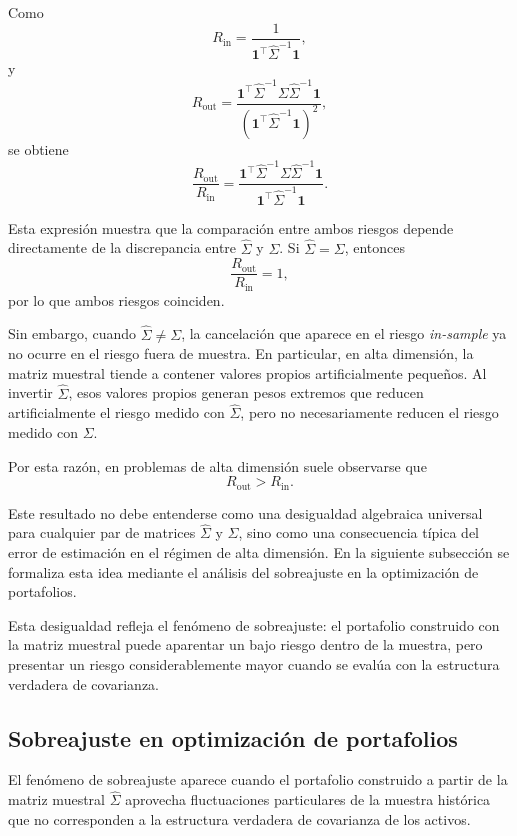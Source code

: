 \documentclass[letterpaper,12pt,oneside]{book}
\begin{document}
Como
\[
R_{\mathrm{in}}
=
\frac{
1
}{
\mathbf{1}^\top
\widehat{\Sigma}^{-1}
\mathbf{1}
},
\]
y
\[
R_{\mathrm{out}}
=
\frac{
\mathbf{1}^\top
\widehat{\Sigma}^{-1}
\Sigma
\widehat{\Sigma}^{-1}
\mathbf{1}
}{
\left(
\mathbf{1}^\top
\widehat{\Sigma}^{-1}
\mathbf{1}
\right)^2
},
\]
se obtiene
\[
\frac{R_{\mathrm{out}}}{R_{\mathrm{in}}}
=
\frac{
\mathbf{1}^\top
\widehat{\Sigma}^{-1}
\Sigma
\widehat{\Sigma}^{-1}
\mathbf{1}
}{
\mathbf{1}^\top
\widehat{\Sigma}^{-1}
\mathbf{1}
}.
\]

Esta expresión muestra que la comparación entre ambos riesgos depende directamente de la discrepancia entre \(\widehat{\Sigma}\) y \(\Sigma\). Si \(\widehat{\Sigma}=\Sigma\), entonces
\[
\frac{R_{\mathrm{out}}}{R_{\mathrm{in}}}
=
1,
\]
por lo que ambos riesgos coinciden.

Sin embargo, cuando \(\widehat{\Sigma}\neq \Sigma\), la cancelación que aparece en el riesgo \textit{in-sample} ya no ocurre en el riesgo fuera de muestra. En particular, en alta dimensión, la matriz muestral tiende a contener valores propios artificialmente pequeños. Al invertir \(\widehat{\Sigma}\), esos valores propios generan pesos extremos que reducen artificialmente el riesgo medido con \(\widehat{\Sigma}\), pero no necesariamente reducen el riesgo medido con \(\Sigma\).

Por esta razón, en problemas de alta dimensión suele observarse que
\[
R_{\mathrm{out}}
>
R_{\mathrm{in}}.
\]

Este resultado no debe entenderse como una desigualdad algebraica universal para cualquier par de matrices \(\widehat{\Sigma}\) y \(\Sigma\), sino como una consecuencia típica del error de estimación en el régimen de alta dimensión. En la siguiente subsección se formaliza esta idea mediante el análisis del sobreajuste en la optimización de portafolios.

Esta desigualdad refleja el fenómeno de sobreajuste: el portafolio construido con la matriz muestral puede aparentar un bajo riesgo dentro de la muestra, pero presentar un riesgo considerablemente mayor cuando se evalúa con la estructura verdadera de covarianza.

\subsection{Sobreajuste en optimización de portafolios}

El fenómeno de sobreajuste aparece cuando el portafolio construido a partir de la matriz muestral \(\widehat{\Sigma}\) aprovecha fluctuaciones particulares de la muestra histórica que no corresponden a la estructura verdadera de covarianza de los activos.
\end{document}
